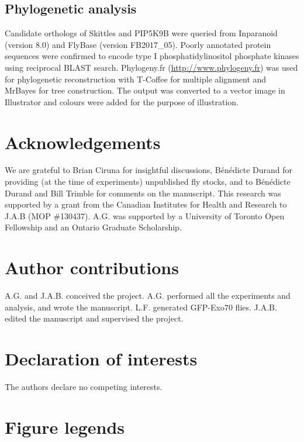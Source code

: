 \documentclass[12pt, twoside, letterpaper]{article}
\begin{document}
\begin{doublespacing}
\begin{linenumbers}
    \subsection*{Phylogenetic analysis}
    Candidate orthologs of Skittles and PIP5K9B were queried
    from Inparanoid (version 8.0) and FlyBase (version FB2017\_05).
    Poorly annotated protein sequences were confirmed
    to encode type I phosphatidylinositol phosphate
    kinases using reciprocal BLAST search.
    Phylogeny.fr (\url{http://www.phylogeny.fr}) \citep{dereeper2008phylogeny} was used for
    phylogenetic reconstruction with T-Coffee for multiple alignment
    and MrBayes for tree construction.
    The output was converted to a vector image in Illustrator
    and colours were added for the purpose of illustration.

    \section*{Acknowledgements}
    We are grateful to Brian Ciruna for insightful discussions,
    B{\'e}n{\'e}dicte Durand for providing (at the time of experiments)
    unpublished fly stocks, and to
    B{\'e}n{\'e}dicte Durand and Bill Trimble
    for comments on the manuscript.
    This research was supported by a grant from the Canadian Institutes for
    Health and Research to J.A.B (MOP \#130437).
    A.G. was supported by a
    University of Toronto Open Fellowship and
    an Ontario Graduate Scholarship.
    
    \section*{Author contributions}
    A.G. and J.A.B. conceived the project.
    A.G. performed all the experiments and analysis, and wrote the manuscript.
    L.F. generated GFP-Exo70 flies.
    J.A.B. edited the manuscript and supervised the project.
    
    \section*{Declaration of interests}
    The authors declare no competing interests.
    

    \section*{Figure legends}
    

\end{linenumbers}
\end{doublespacing}
\end{document}
